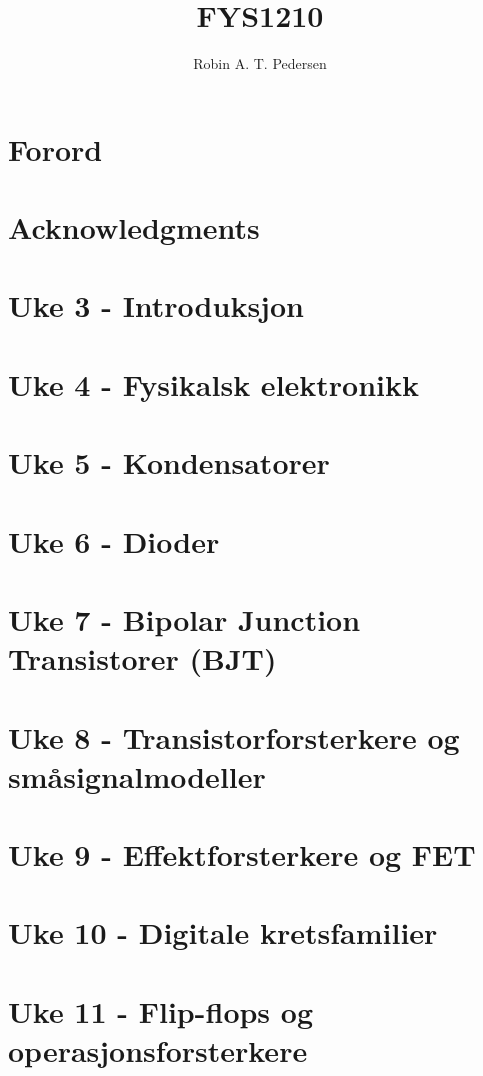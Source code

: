 \documentclass{article}
\begin{document}
  \title{FYS1210}
  \author{Robin A. T. Pedersen}
  \maketitle
  \tableofcontents

  \section{Forord}
    
  \section{Acknowledgments}
    
  \section{Uke 3 - Introduksjon}
    
  \section{Uke 4 - Fysikalsk elektronikk}
    
  \section{Uke 5 - Kondensatorer}
    
  \section{Uke 6 - Dioder}
    
  \section{Uke 7 - Bipolar Junction Transistorer (BJT)}
    
  \section{Uke 8 - Transistorforsterkere og småsignalmodeller}
    
  \section{Uke 9 - Effektforsterkere og FET}
    
  \section{Uke 10 - Digitale kretsfamilier}
    
  \section{Uke 11 - Flip-flops og operasjonsforsterkere}
    
\end{document}
